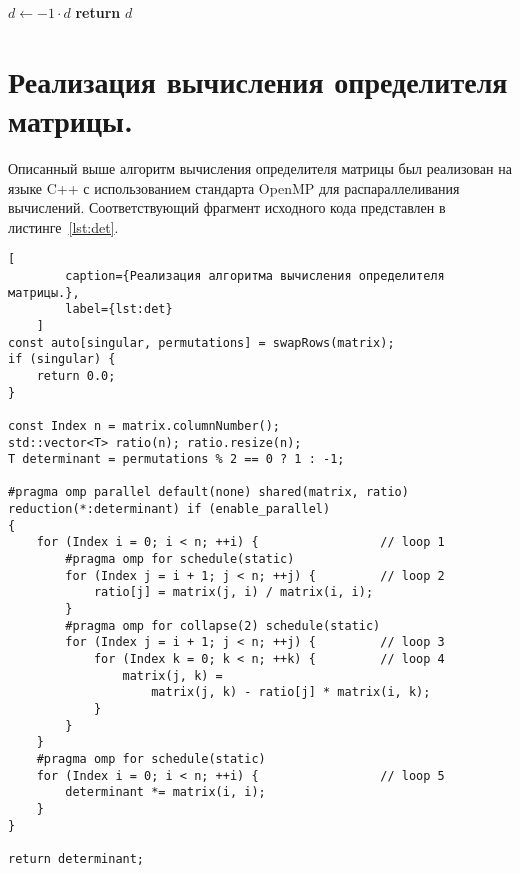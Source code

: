 \documentclass[a4paper,14pt]{extarticle}
\begin{document}
    \begin{algorithm}[h]
        \begin{algorithmic}[1]
            \State $d \gets -1 \cdot d$
            \EndIf
            \State \textbf{return} $d$
            \EndFunction
        \end{algorithmic}
    \end{algorithm}

    \section{Реализация вычисления определителя матрицы.}

    Описанный выше алгоритм вычисления определителя матрицы был реализован на языке C++ с использованием
    стандарта OpenMP для распараллеливания вычислений.
    Соответствующий фрагмент исходного кода представлен в листинге~\ref{lst:det}.
    \vspace{0.5em}
    \begin{lstlisting}[
        caption={Реализация алгоритма вычисления определителя матрицы.},
        label={lst:det}
    ]
const auto[singular, permutations] = swapRows(matrix);
if (singular) {
    return 0.0;
}

const Index n = matrix.columnNumber();
std::vector<T> ratio(n); ratio.resize(n);
T determinant = permutations % 2 == 0 ? 1 : -1;

#pragma omp parallel default(none) shared(matrix, ratio)
reduction(*:determinant) if (enable_parallel)
{
    for (Index i = 0; i < n; ++i) {                 // loop 1
        #pragma omp for schedule(static)
        for (Index j = i + 1; j < n; ++j) {         // loop 2
            ratio[j] = matrix(j, i) / matrix(i, i);
        }
        #pragma omp for collapse(2) schedule(static)
        for (Index j = i + 1; j < n; ++j) {         // loop 3
            for (Index k = 0; k < n; ++k) {         // loop 4
                matrix(j, k) =
                    matrix(j, k) - ratio[j] * matrix(i, k);
            }
        }
    }
    #pragma omp for schedule(static)
    for (Index i = 0; i < n; ++i) {                 // loop 5
        determinant *= matrix(i, i);
    }
}

return determinant;
\end{lstlisting}
\end{document}
